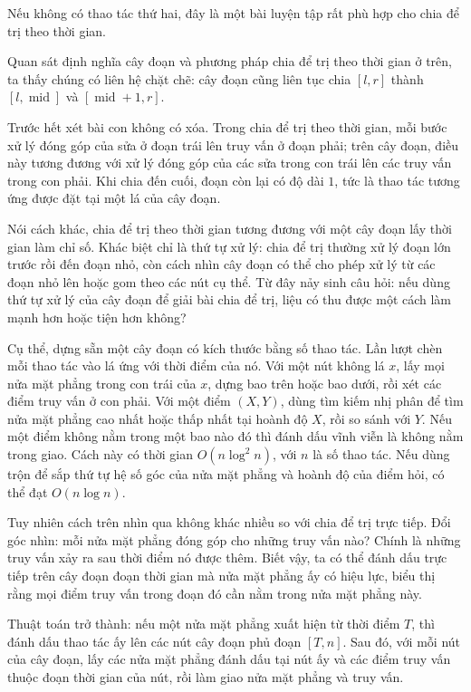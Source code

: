 \documentclass[11pt]{article}
\begin{document}
Nếu không có thao tác thứ hai, đây là một bài luyện tập rất phù hợp cho chia
để trị theo thời gian.

Quan sát định nghĩa cây đoạn và phương pháp chia để trị theo thời gian ở trên,
ta thấy chúng có liên hệ chặt chẽ: cây đoạn cũng liên tục chia
\([l,r]\) thành \([l,\operatorname{mid}]\) và
\([\operatorname{mid}+1,r]\).

Trước hết xét bài con không có xóa. Trong chia để trị theo thời gian, mỗi bước
xử lý đóng góp của sửa ở đoạn trái lên truy vấn ở đoạn phải; trên cây đoạn,
điều này tương đương với xử lý đóng góp của các sửa trong con trái lên các
truy vấn trong con phải. Khi chia đến cuối, đoạn còn lại có độ dài \(1\), tức
là thao tác tương ứng được đặt tại một lá của cây đoạn.

Nói cách khác, chia để trị theo thời gian tương đương với một cây đoạn lấy
thời gian làm chỉ số. Khác biệt chỉ là thứ tự xử lý: chia để trị thường xử lý
đoạn lớn trước rồi đến đoạn nhỏ, còn cách nhìn cây đoạn có thể cho phép xử lý
từ các đoạn nhỏ lên hoặc gom theo các nút cụ thể. Từ đây nảy sinh câu hỏi:
nếu dùng thứ tự xử lý của cây đoạn để giải bài chia để trị, liệu có thu được
một cách làm mạnh hơn hoặc tiện hơn không?

Cụ thể, dựng sẵn một cây đoạn có kích thước bằng số thao tác. Lần lượt chèn
mỗi thao tác vào lá ứng với thời điểm của nó. Với một nút không lá \(x\), lấy
mọi nửa mặt phẳng trong con trái của \(x\), dựng bao trên hoặc bao dưới, rồi
xét các điểm truy vấn ở con phải. Với một điểm \((X,Y)\), dùng tìm kiếm nhị
phân để tìm nửa mặt phẳng cao nhất hoặc thấp nhất tại hoành độ \(X\), rồi so
sánh với \(Y\). Nếu một điểm không nằm trong một bao nào đó thì đánh dấu vĩnh
viễn là không nằm trong giao. Cách này có thời gian
\(O(n\log^2 n)\), với \(n\) là số thao tác. Nếu dùng trộn để sắp thứ tự hệ số
góc của nửa mặt phẳng và hoành độ của điểm hỏi, có thể đạt
\(O(n\log n)\).

Tuy nhiên cách trên nhìn qua không khác nhiều so với chia để trị trực tiếp.
Đổi góc nhìn: mỗi nửa mặt phẳng đóng góp cho những truy vấn nào? Chính là
những truy vấn xảy ra sau thời điểm nó được thêm. Biết vậy, ta có thể đánh dấu
trực tiếp trên cây đoạn đoạn thời gian mà nửa mặt phẳng ấy có hiệu lực, biểu
thị rằng mọi điểm truy vấn trong đoạn đó cần nằm trong nửa mặt phẳng này.

Thuật toán trở thành: nếu một nửa mặt phẳng xuất hiện từ thời điểm \(T\), thì
đánh dấu thao tác ấy lên các nút cây đoạn phủ đoạn \([T,n]\). Sau đó, với mỗi
nút của cây đoạn, lấy các nửa mặt phẳng đánh dấu tại nút ấy và các điểm truy
vấn thuộc đoạn thời gian của nút, rồi làm giao nửa mặt phẳng và truy vấn.
\end{document}
